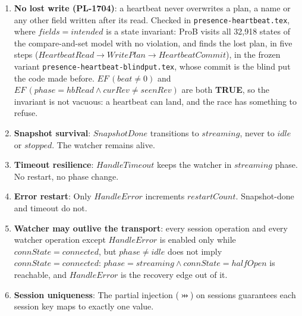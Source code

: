 \documentclass[a4paper,10pt,fleqn]{article}
\begin{document}
\begin{enumerate}
    the running system, not as a gap in the property itself.  The pre-fix
    defect is reproduced,
    for $k = talk$, by replacing the $Subscribe$ guard with the
    ``re-subscribe only when the handle is \texttt{None}'' condition
    $subGen(talk) = 0$: the same CTL formula then goes \textbf{FALSE},
    with probcli returning the counterexample $connState = connected
    \land generation = 3 \land subGen(talk) = 2$ --- a live client whose
    talk SUB is stuck on the superseded generation $2$, never re-opened.
    That state \emph{is} biff-9la, and the same defect shape --- a guard
    that checks ``never subscribed'' instead of ``subscribed to a
    superseded generation'' --- would equally strand $inboxNotify$ or
    $kvWatch$ were the fix not applied uniformly across the family.

  \item \textbf{No lost write (PL-1704)}: a heartbeat never overwrites a
    plan, a name or any other field written after its read.  Checked in
    \texttt{presence-heartbeat.tex}, where $fields = intended$ is a state
    invariant: ProB visits all 32,918 states of the compare-and-set model with no
    violation, and finds the lost plan, in five steps ($HeartbeatRead \to
    WritePlan \to HeartbeatCommit$), in the frozen variant
    \texttt{presence-heartbeat-blindput.tex}, whose commit is the blind put the
    code made before.  $EF\,(beat \neq 0)$ and $EF\,(phase = hbRead \land
    curRev \neq seenRev)$ are both \textbf{TRUE}, so the invariant is not
    vacuous: a heartbeat can land, and the race has something to refuse.

  \item \textbf{Snapshot survival}: $SnapshotDone$ transitions to
    $streaming$, never to $idle$ or $stopped$.  The watcher
    remains alive.

  \item \textbf{Timeout resilience}: $HandleTimeout$ keeps the
    watcher in $streaming$ phase.  No restart, no phase change.

  \item \textbf{Error restart}: Only $HandleError$ increments
    $restartCount$.  Snapshot-done and timeout do not.

  \item \textbf{Watcher may outlive the transport}: every session
    operation and every watcher operation except $HandleError$ is
    enabled only while $connState = connected$, but $phase \neq idle$
    does not imply $connState = connected$: $phase = streaming \land
    connState = halfOpen$ is reachable, and $HandleError$ is the
    recovery edge out of it.

  \item \textbf{Session uniqueness}: The partial injection
    ($\pinj$) on sessions guarantees each session key maps to
    exactly one value.
\end{enumerate}
\end{document}
